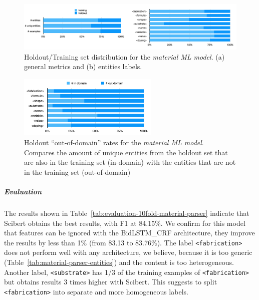 \documentclass[]{interact}
\theoremstyle{plain}%
\theoremstyle{definition}
\theoremstyle{remark}
\begin{document}
\begin{figure}[ht]
    \centering
    \includegraphics[width=\textwidth]{material-holdout-training-set}
    \caption{Holdout/Training set distribution for the \textit{material ML model}. (a) general metrics and (b) entities labels.}
    \label{fig:material-training-holdout-set-distribution}
\end{figure}

\begin{figure}[ht]
    \centering
    \includegraphics[width=0.6\textwidth]{material-out-domain-holdout-unique}
    \caption{Holdout ``out-of-domain'' rates for the \textit{material ML model}. Compares the amount of unique entities from the holdout set that are also in the training set (in-domain) with the entities that are not in the training set (out-of-domain)}
    \label{fig:material-out-domain-holdout}
\end{figure}

\subparagraph*{Evaluation}

The results shown in Table~\ref{tab:evaluation-10fold-material-parser} indicate that Scibert obtains the best results, with F1 at 84.15\%.
We confirm for this model that features can be ignored with the BidLSTM\_CRF architecture, they improve the results by less than 1\% (from 83.13 to 83.76\%).
The label \texttt{<fabrication>} does not perform well with any architecture, we believe, because it is too generic (Table~\ref{tab:material-parser-entities}) and the content is too heterogeneous. Another label, \texttt{<substrate>} has 1/3 of the training examples of \texttt{<fabrication>} but obtains results 3 times higher with Scibert.
This suggests to split \texttt{<fabrication>} into separate and more homogeneous labels.
\end{document}
